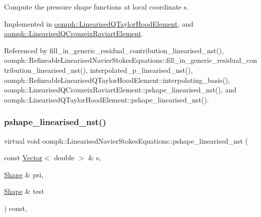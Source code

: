 Compute the pressure shape functions at local coordinate s. 



Implemented in \hyperlink{classoomph_1_1LinearisedQTaylorHoodElement_a948a02f3480faa9439fb72932e344dcf}{oomph\+::\+Linearised\+Q\+Taylor\+Hood\+Element}, and \hyperlink{classoomph_1_1LinearisedQCrouzeixRaviartElement_ad90494427c784a07e843d88748c72cee}{oomph\+::\+Linearised\+Q\+Crouzeix\+Raviart\+Element}.



Referenced by fill\+\_\+in\+\_\+generic\+\_\+residual\+\_\+contribution\+\_\+linearised\+\_\+nst(), oomph\+::\+Refineable\+Linearised\+Navier\+Stokes\+Equations\+::fill\+\_\+in\+\_\+generic\+\_\+residual\+\_\+contribution\+\_\+linearised\+\_\+nst(), interpolated\+\_\+p\+\_\+linearised\+\_\+nst(), oomph\+::\+Refineable\+Linearised\+Q\+Taylor\+Hood\+Element\+::interpolating\+\_\+basis(), oomph\+::\+Linearised\+Q\+Crouzeix\+Raviart\+Element\+::pshape\+\_\+linearised\+\_\+nst(), and oomph\+::\+Linearised\+Q\+Taylor\+Hood\+Element\+::pshape\+\_\+linearised\+\_\+nst().

\mbox{\label{classoomph_1_1LinearisedNavierStokesEquations_a10130c3d5e96459201ef87b196427c60}} 
\subsubsection{\texorpdfstring{pshape\+\_\+linearised\+\_\+nst()}{pshape\_linearised\_nst()}\hspace{0.1cm}{\footnotesize\ttfamily [2/2]}}
{\footnotesize\ttfamily virtual void oomph\+::\+Linearised\+Navier\+Stokes\+Equations\+::pshape\+\_\+linearised\+\_\+nst (\begin{DoxyParamCaption}\item[{const \hyperlink{classoomph_1_1Vector}{Vector}$<$ double $>$ \&}]{s,  }\item[{\hyperlink{classoomph_1_1Shape}{Shape} \&}]{psi,  }\item[{\hyperlink{classoomph_1_1Shape}{Shape} \&}]{test }\end{DoxyParamCaption}) const\hspace{0.3cm}{\ttfamily [protected]}, {}}



